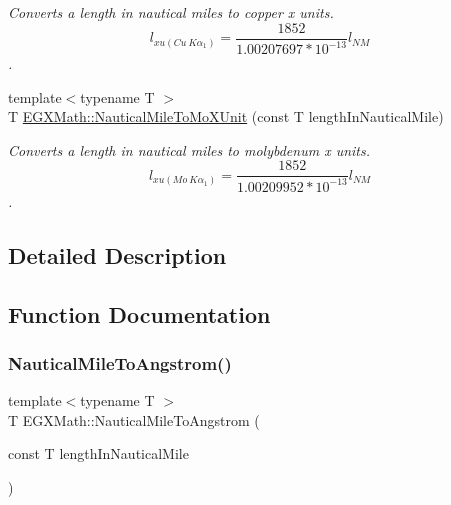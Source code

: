 \begin{DoxyCompactItemize}
\begin{DoxyCompactList}\small\item\em Converts a length in nautical miles to copper x units. \[ l_{xu(Cu\ K\alpha_1)}= \frac{1852}{1.00207697*10^{-13}} l_{NM}\]. \end{DoxyCompactList}\item 
{\footnotesize template$<$typename T $>$ }\\T \mbox{\hyperlink{group___e_g_x_math-_conversions-_length_conversions-_non-_s_i-_nautical_mile-_non-_s_i_ga17cfe98568d00c2e0b1c0b5d19f1b34e}{E\+G\+X\+Math\+::\+Nautical\+Mile\+To\+Mo\+X\+Unit}} (const T length\+In\+Nautical\+Mile)
\begin{DoxyCompactList}\small\item\em Converts a length in nautical miles to molybdenum x units. \[ l_{xu(Mo\ K\alpha_1)}=\frac{1852}{1.00209952*10^{-13}} l_{NM}\]. \end{DoxyCompactList}\end{DoxyCompactItemize}


\subsection{Detailed Description}


\subsection{Function Documentation}
\mbox{\label{group___e_g_x_math-_conversions-_length_conversions-_non-_s_i-_nautical_mile-_non-_s_i_ga6f451e4456d985c7d63b39a084b3dd23}} 
\subsubsection{\texorpdfstring{Nautical\+Mile\+To\+Angstrom()}{NauticalMileToAngstrom()}}
{\footnotesize\ttfamily template$<$typename T $>$ \\
T E\+G\+X\+Math\+::\+Nautical\+Mile\+To\+Angstrom (\begin{DoxyParamCaption}\item[{const T}]{length\+In\+Nautical\+Mile }\end{DoxyParamCaption})}



